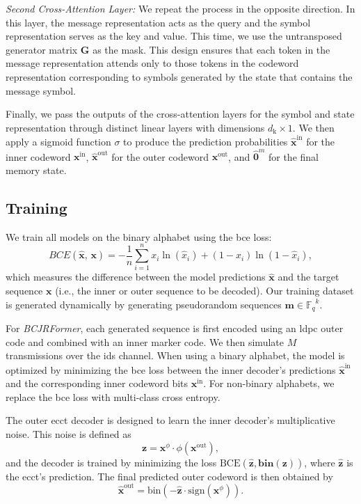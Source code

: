 \documentclass[conference,letterpaperu]{IEEEtran}
\newcommand{\cc}{\ensuremath{,\,}}
\newcommand{\yin}{\ensuremath{\bm{x}^{\text{in}}}}
\newcommand{\yout}{\ensuremath{\bm{x}^{\text{out}}}}
\newcommand{\mess}{\ensuremath{\bm{m}}}
\newcommand{\predyout}{\ensuremath{\bm{\hat{x}}^{\text{out}}}}
\newcommand{\predyin}{\ensuremath{\bm{\hat{x}}^{\text{in}}}}
\newcommand{\bipolar}{\ensuremath{\phi}}
\newcommand{\bin}{\ensuremath{\text{bin}}}
\newcommand{\ybipolar}{\ensuremath{\bm{x}^{\bipolar}}}
\newcommand{\ymodel}{\ensuremath{\bm{\hat{x}}}}
\newcommand{\ymodelIx}{\ensuremath{\hat{x}}}
\newcommand{\gen}{\ensuremath{\bm{G}}}
\newcommand{\alphabet}{\ensuremath{\mathbb{F}_q}}
\newcommand{\hiddenDim}{\ensuremath{d_{\text{k}}}}
\begin{document}
\noindent\textit{Second Cross-Attention Layer:} 
We repeat the process in the opposite direction. In this layer, the message representation acts as the query and the symbol representation serves as the key and value. This time, we use the untransposed generator matrix $\gen$ as the mask. This design ensures that each token in the message representation attends only to those tokens in the codeword representation corresponding to symbols generated by the state that contains the message symbol. 

Finally, we pass the outputs of the cross-attention layers for the symbol and state representation through distinct linear layers with dimensions $\hiddenDim \times 1$. We then apply a sigmoid function $\sigma$ to produce the prediction probabilities $\predyin$ for the inner codeword $\yin$, $\predyout$ for the outer codeword $\yout$, and $\hat{\bm{0}}^m$ for the final memory state.

\subsection{Training}
We train all models on the binary alphabet using the \ac{bce} loss:
\begin{equation}
\label{eq:BCE}
BCE(\ymodel\cc \bm{x}) = -\frac{1}{n} \sum_{i=1}^{n} x_i\ln(\ymodelIx_i) + (1 - x_i)\ln(1 - \ymodelIx_i),
\end{equation}
which measures the difference between the model predictions $\ymodel$ and the target sequence $\bm{x}$ (i.e., the inner or outer sequence to be decoded). Our training dataset is generated dynamically by generating pseudorandom sequences $\mess \in \alphabet^k$.

For \textit{BCJRFormer}, each generated sequence is first encoded using an \ac{ldpc} outer code and combined with an inner marker code. We then simulate $M$ transmissions over the \ac{ids} channel. When using a binary alphabet, the model is optimized by minimizing the \ac{bce} loss between the inner decoder's predictions $\predyin$ and the corresponding inner codeword bits $\yin$. For non-binary alphabets, we replace the \ac{bce} loss with multi-class cross entropy.

The outer \ac{ecct} decoder is designed to learn the inner decoder's multiplicative noise. This noise is defined as $$\bm{z} = \ybipolar \cdot \bipolar(\yout),$$ and the decoder is trained by minimizing the loss $\text{BCE}(\bm{\hat{z}}, \bm{\bin(z)})$, where $\bm{\hat{z}}$ is the \ac{ecct}'s prediction. The final predicted outer codeword is then obtained by $$\predyout = \bin(-\bm{\hat{z}} \cdot \text{sign}(\ybipolar)).$$
\end{document}
